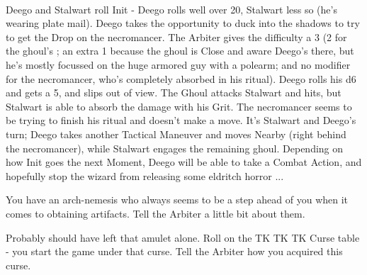 {{    ~\\

    Deego and Stalwart roll Init - Deego rolls well over 20, Stalwart less so (he's wearing plate mail).  Deego takes the opportunity to duck into the shadows to try to get the Drop on the necromancer. The Arbiter gives the difficulty a 3 (2 for the ghoul's \HD; an extra 1 because the ghoul is Close and aware Deego's there, but he's mostly focussed on the huge armored guy with a polearm; and no modifier for the necromancer, who's completely absorbed in his ritual). Deego rolls his d6 and gets a 5, and slips out of view.  The Ghoul attacks Stalwart and hits, but Stalwart is able to absorb the damage with his Grit.  The necromancer seems to be trying to finish his ritual and doesn't make a move.  It's Stalwart and Deego's turn; Deego takes another Tactical Maneuver and moves Nearby (right behind the necromancer), while Stalwart engages the remaining ghoul.  Depending on how Init goes the next Moment, Deego will be able to take a Combat Action, and hopefully stop the wizard from releasing some eldritch horror ...
  }

 \cbreak



    
    You have an arch-nemesis who always seems to be a step ahead of you when it comes to obtaining artifacts. Tell the Arbiter a little bit about them.


    Probably should have left that amulet alone.  Roll on the TK TK TK Curse table - you start the game under that curse.  Tell the Arbiter how you acquired this curse.

}
